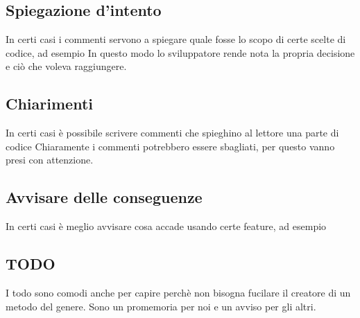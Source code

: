 \documentclass[11pt,a4paper]{book}
\begin{document}
\subsection{Spiegazione d'intento}
In certi casi i commenti servono a spiegare quale fosse lo scopo di certe scelte di codice, ad esempio
\label{code: 027}
In questo modo lo sviluppatore rende nota la propria decisione e ciò che voleva raggiungere.

\subsection{Chiarimenti}
In certi casi è possibile scrivere commenti che spieghino al lettore una parte di codice 
\label{code: 028}
Chiaramente i commenti potrebbero essere sbagliati, per questo vanno presi con attenzione.

\subsection{Avvisare delle conseguenze}
In certi casi è meglio avvisare cosa accade usando certe feature, ad esempio
\label{code: 029}

\subsection{TODO}
\label{code: 030}
I todo sono comodi anche per capire perchè non bisogna fucilare il creatore di un metodo del genere. Sono un promemoria per noi e un avviso per gli altri.
\end{document}
